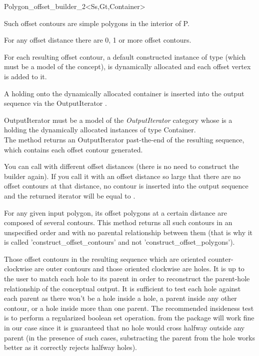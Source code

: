 \begin{ccRefClass}{Polygon_offset_builder_2<Ss,Gt,Container>}
{Such offset contours are simple polygons in the interior of P.

For any offset distance  there are 0, 1 or more offset contours.

For each resulting offset contour, a default constructed instance of  type (which must be a model of the  concept), is dynamically allocated and each offset vertex is added to it.

A  holding onto the dynamically allocated container is inserted into the output sequence via the OutputIterator .

OutputIterator must be a model of the \textit{OutputIterator} category whose  is a  holding the dynamically allocated instances of type Container.\\
The method returns an OutputIterator past-the-end of the resulting sequence, which contains each offset contour generated.

You can call  with different offset distances (there is no need to construct the builder  again). If you call it with an offset distance so large that there are no offset contours at that distance, no contour is inserted into the output sequence and the returned iterator will be equal to .

For any given input polygon, its offset polygons at a certain distance are composed of several contours. This method returns all such contours in an unspecified order and with no parental relationship between them (that is why it is called 'construct_offset_contours' and not 'construct_offset_polygons').

Those offset contours in the resulting sequence which are oriented counter-clockwise are outer contours and those oriented clockwise are holes. It is up to the user to match each hole to its parent in order to reconstruct the parent-hole relationship of the conceptual output. It is sufficient to test each hole against each parent as there won't be a hole inside a hole, a parent inside any other contour, or a hole inside more than one parent. The recommended insideness test is to perform a regularized boolean set operation.  from the  package will work fine in our case since it is guaranteed that no hole would cross halfway outside any parent (in the presence of such cases, substracting the parent from the hole works better as it correctly rejects halfway holes).}
  

\ccSeeAlso
{}\\
\\
\\
\end{ccRefClass}

